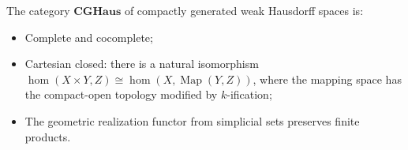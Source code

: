 The category $\mathbf{CGHaus}$ of compactly generated weak Hausdorff spaces is:
\begin{itemize}
\item Complete and cocomplete;
\item Cartesian closed: there is a natural isomorphism $\hom(X \times Y, Z) \cong \hom(X, \operatorname{Map}(Y, Z))$, where the mapping space has the compact-open topology modified by $k$-ification;
\item The geometric realization functor from simplicial sets preserves finite products.
\end{itemize}